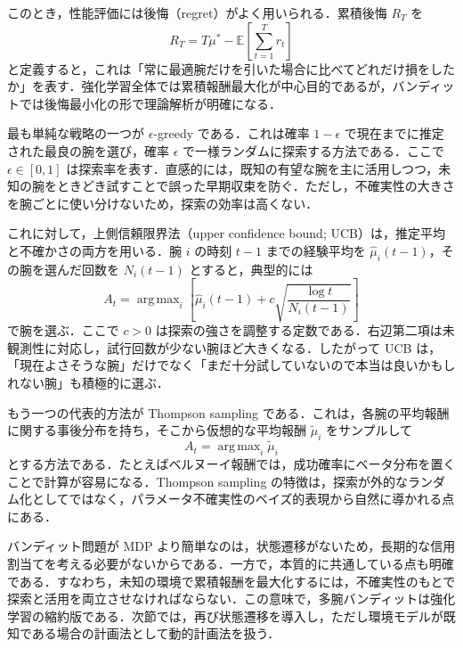 このとき，性能評価には後悔（regret）がよく用いられる．累積後悔 $R_T$ を
\begin{equation}
R_T
=
T \mu^\ast - \mathbb{E}\left[\sum_{t=1}^{T} r_t\right]
\end{equation}
と定義すると，これは「常に最適腕だけを引いた場合に比べてどれだけ損をしたか」を表す．強化学習全体では累積報酬最大化が中心目的であるが，バンディットでは後悔最小化の形で理論解析が明確になる．

最も単純な戦略の一つが $\epsilon$-greedy である．これは確率 $1-\epsilon$ で現在までに推定された最良の腕を選び，確率 $\epsilon$ で一様ランダムに探索する方法である．ここで $\epsilon \in [0,1]$ は探索率を表す．直感的には，既知の有望な腕を主に活用しつつ，未知の腕をときどき試すことで誤った早期収束を防ぐ．ただし，不確実性の大きさを腕ごとに使い分けないため，探索の効率は高くない．

これに対して，上側信頼限界法（upper confidence bound; UCB）は，推定平均と不確かさの両方を用いる\cite{Auer2002}．腕 $i$ の時刻 $t-1$ までの経験平均を $\hat{\mu}_i(t-1)$，その腕を選んだ回数を $N_i(t-1)$ とすると，典型的には
\begin{equation}
A_t
=
\mathop{\mathrm{arg\,max}}_i
\left[
\hat{\mu}_i(t-1)
+
c \sqrt{\frac{\log t}{N_i(t-1)}}
\right]
\end{equation}
で腕を選ぶ．ここで $c>0$ は探索の強さを調整する定数である．右辺第二項は未観測性に対応し，試行回数が少ない腕ほど大きくなる．したがって UCB は，「現在よさそうな腕」だけでなく「まだ十分試していないので本当は良いかもしれない腕」も積極的に選ぶ．

もう一つの代表的方法が Thompson sampling である\cite{Thompson1933}．これは，各腕の平均報酬に関する事後分布を持ち，そこから仮想的な平均報酬 $\tilde{\mu}_i$ をサンプルして
\begin{equation}
A_t = \mathop{\mathrm{arg\,max}}_i \tilde{\mu}_i
\end{equation}
とする方法である．たとえばベルヌーイ報酬では，成功確率にベータ分布を置くことで計算が容易になる．Thompson sampling の特徴は，探索が外的なランダム化としてではなく，パラメータ不確実性のベイズ的表現から自然に導かれる点にある．

バンディット問題が MDP より簡単なのは，状態遷移がないため，長期的な信用割当てを考える必要がないからである．一方で，本質的に共通している点も明確である．すなわち，未知の環境で累積報酬を最大化するには，不確実性のもとで探索と活用を両立させなければならない．この意味で，多腕バンディットは強化学習の縮約版である．次節では，再び状態遷移を導入し，ただし環境モデルが既知である場合の計画法として動的計画法を扱う．

